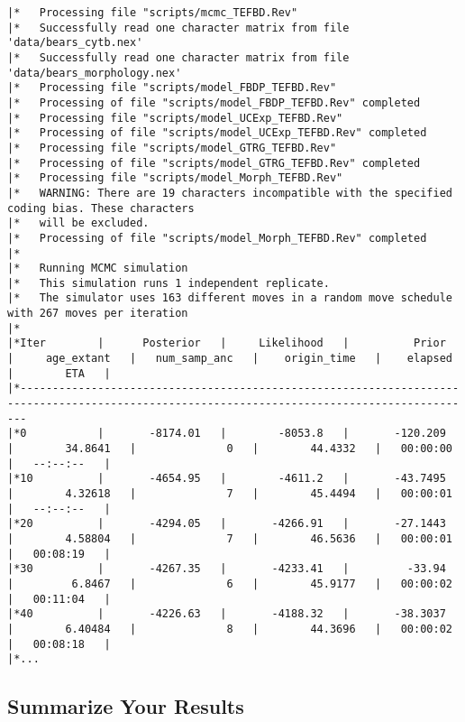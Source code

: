 {\tiny{\tt \begin{snugshade*}
\begin{lstlisting}
|*   Processing file "scripts/mcmc_TEFBD.Rev"
|*   Successfully read one character matrix from file 'data/bears_cytb.nex'
|*   Successfully read one character matrix from file 'data/bears_morphology.nex'
|*   Processing file "scripts/model_FBDP_TEFBD.Rev"
|*   Processing of file "scripts/model_FBDP_TEFBD.Rev" completed
|*   Processing file "scripts/model_UCExp_TEFBD.Rev"
|*   Processing of file "scripts/model_UCExp_TEFBD.Rev" completed
|*   Processing file "scripts/model_GTRG_TEFBD.Rev"
|*   Processing of file "scripts/model_GTRG_TEFBD.Rev" completed
|*   Processing file "scripts/model_Morph_TEFBD.Rev"
|*   WARNING: There are 19 characters incompatible with the specified coding bias. These characters
|*   will be excluded.
|*   Processing of file "scripts/model_Morph_TEFBD.Rev" completed
|*
|*   Running MCMC simulation
|*   This simulation runs 1 independent replicate.
|*   The simulator uses 163 different moves in a random move schedule with 267 moves per iteration
|*
|*Iter        |      Posterior   |     Likelihood   |          Prior   |     age_extant   |   num_samp_anc   |    origin_time   |    elapsed   |        ETA   |
|*---------------------------------------------------------------------------------------------------------------------------------------------
|*0           |       -8174.01   |        -8053.8   |       -120.209   |        34.8641   |              0   |        44.4332   |   00:00:00   |   --:--:--   |
|*10          |       -4654.95   |        -4611.2   |       -43.7495   |        4.32618   |              7   |        45.4494   |   00:00:01   |   --:--:--   |
|*20          |       -4294.05   |       -4266.91   |       -27.1443   |        4.58804   |              7   |        46.5636   |   00:00:01   |   00:08:19   |
|*30          |       -4267.35   |       -4233.41   |         -33.94   |         6.8467   |              6   |        45.9177   |   00:00:02   |   00:11:04   |
|*40          |       -4226.63   |       -4188.32   |       -38.3037   |        6.40484   |              8   |        44.3696   |   00:00:02   |   00:08:18   |
|*...
\end{lstlisting}
\end{snugshade*}}}

\bigskip
\subsection{Summarize Your Results}\label{subsect:RB-SummarizeResults}

